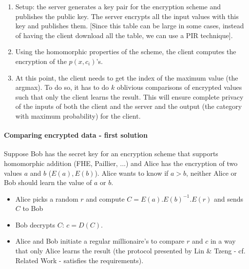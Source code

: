 \documentclass[11pt]{article}
\begin{document}
	\begin{enumerate}
		\item Setup: the server generates a key pair for the encryption scheme and publishes the public key. The server encrypts all the input values with this key and publishes them. [Since this table can be large in some cases, instead of having the client download all
		the table, we can use a PIR technique].
		
		\item Using the homomorphic properties of the scheme, the client computes the encryption of the $p(x,c_i)$'s.
		
		\item At this point, the client needs to get the index of the maximum value (the argmax). 
		To do so, it has to do $k$ oblivious comparisons of encrypted values such that only the client learns the result. This will ensure complete privacy of the inputs of both the client and the server and the output (the category with maximum probability) for the client.     
		
	\end{enumerate}
	
	\paragraph{Comparing encrypted data - first solution}
	Suppose Bob has the secret key for an encryption scheme that supports homomorphic addition (FHE, Paillier, ...) and Alice has the encryption of two values $a$ and $b$ ($E(a), E(b)$). Alice wants to know if $a > b$, neither Alice or Bob should learn the value of $a$ or $b$.
	\begin{itemize}
		\item Alice picks a random $r$ and compute $C = E(a).E(b)^{-1}.E(r)$ and sends $C$ to Bob
		
		\item Bob decrypts $C$: $c = D(C)$.
		
		\item Alice and Bob initiate a regular millionaire's to compare $r$ and $c$ in a way that only Alice learns the result (the protocol presented by Lin \& Tzeng - cf. Related Work - satisfies the requirements). 
	\end{itemize} 
	      	
\end{document}
